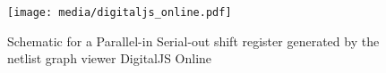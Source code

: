
\begin{figure}[t]
    \centering
    \texttt{[image: media/digitaljs\_online.pdf]}
    \caption{Schematic for a Parallel-in Serial-out shift register generated by the netlist graph viewer DigitalJS Online \cite{DigitalJSOnline}}
    \label{fig:digitaljs_online}
\end{figure}
